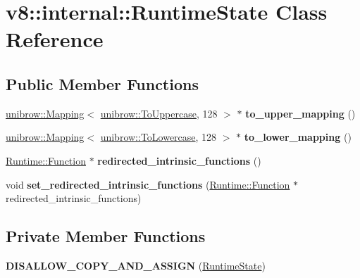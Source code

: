 \hypertarget{classv8_1_1internal_1_1_runtime_state}{}\section{v8\+:\+:internal\+:\+:Runtime\+State Class Reference}
\label{classv8_1_1internal_1_1_runtime_state}
\subsection*{Public Member Functions}
\begin{DoxyCompactItemize}
\item 
\hyperlink{classunibrow_1_1_mapping}{unibrow\+::\+Mapping}$<$ \hyperlink{structunibrow_1_1_to_uppercase}{unibrow\+::\+To\+Uppercase}, 128 $>$ $\ast$ {\bfseries to\+\_\+upper\+\_\+mapping} ()\hypertarget{classv8_1_1internal_1_1_runtime_state_a56f5f84f2cdad0b5b4332a27f8db60b6}{}\label{classv8_1_1internal_1_1_runtime_state_a56f5f84f2cdad0b5b4332a27f8db60b6}

\item 
\hyperlink{classunibrow_1_1_mapping}{unibrow\+::\+Mapping}$<$ \hyperlink{structunibrow_1_1_to_lowercase}{unibrow\+::\+To\+Lowercase}, 128 $>$ $\ast$ {\bfseries to\+\_\+lower\+\_\+mapping} ()\hypertarget{classv8_1_1internal_1_1_runtime_state_a93ae0cde56b5f23a3efdb4ad7d12ef23}{}\label{classv8_1_1internal_1_1_runtime_state_a93ae0cde56b5f23a3efdb4ad7d12ef23}

\item 
\hyperlink{structv8_1_1internal_1_1_runtime_1_1_function}{Runtime\+::\+Function} $\ast$ {\bfseries redirected\+\_\+intrinsic\+\_\+functions} ()\hypertarget{classv8_1_1internal_1_1_runtime_state_a0900a871ae77f8335ba2a6c03e426fc6}{}\label{classv8_1_1internal_1_1_runtime_state_a0900a871ae77f8335ba2a6c03e426fc6}

\item 
void {\bfseries set\+\_\+redirected\+\_\+intrinsic\+\_\+functions} (\hyperlink{structv8_1_1internal_1_1_runtime_1_1_function}{Runtime\+::\+Function} $\ast$redirected\+\_\+intrinsic\+\_\+functions)\hypertarget{classv8_1_1internal_1_1_runtime_state_a236e4b62dd61be2092a2b1bba415136b}{}\label{classv8_1_1internal_1_1_runtime_state_a236e4b62dd61be2092a2b1bba415136b}

\end{DoxyCompactItemize}
\subsection*{Private Member Functions}
\begin{DoxyCompactItemize}
\item 
{\bfseries D\+I\+S\+A\+L\+L\+O\+W\+\_\+\+C\+O\+P\+Y\+\_\+\+A\+N\+D\+\_\+\+A\+S\+S\+I\+GN} (\hyperlink{classv8_1_1internal_1_1_runtime_state}{Runtime\+State})\hypertarget{classv8_1_1internal_1_1_runtime_state_af811c9fa78fcea5b370d6b229d068517}{}\label{classv8_1_1internal_1_1_runtime_state_af811c9fa78fcea5b370d6b229d068517}

\end{DoxyCompactItemize}
